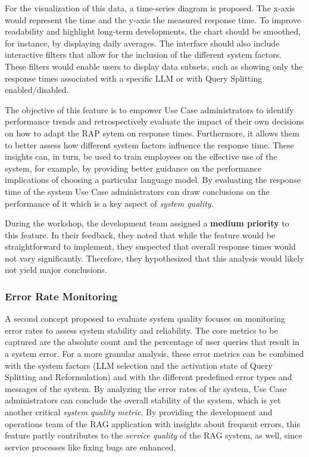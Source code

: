 \documentclass[
	english,
	ruledheaders=section,%
	class=report,%
	thesis={type=bachelor},%
	accentcolor=1b,%
	custommargins=true,%
	marginpar=false,%
	parskip=half-,%
	fontsize=11pt,%
	DIV=14,
]{tudapub}
\begin{document}
For the visualization of this data, a time-series diagram is proposed. The x-axis would represent the time and the y-axis the measured response time. To improve readability and highlight long-term developments, the chart should be smoothed, for instance, by displaying daily averages. The interface should also include interactive filters that allow for the inclusion of the different system factors. These filters would enable users to display data subsets, such as showing only the response times associated with a specific LLM or with Query Splitting enabled/disabled.

The objective of this feature is to empower Use Case administrators to identify performance trends and retrospectively evaluate the impact of their own decisions on how to adapt the RAP sytem on response times. Furthermore, it allows them to better assess how different system factors influence the response time. These insights can, in turn, be used to train employees on the effective use of the system, for example, by providing better guidance on the performance implications of choosing a particular language model. By evaluating the response time of the system Use Case administrators can draw conclusions on the performance of it which is a key aspect of \textit{system quality}.

During the workshop, the development team assigned a \textbf{medium priority} to this feature. In their feedback, they noted that while the feature would be straightforward to implement, they suspected that overall response times would not vary significantly. Therefore, they hypothesized that this analysis would likely not yield major conclusions.

\subsubsection{Error Rate Monitoring}
A second concept proposed to evaluate system quality focuses on monitoring error rates to assess system stability and reliability. The core metrics to be captured are the absolute count and the percentage of user queries that result in a system error. For a more granular analysis, these error metrics can be combined with the system factors (LLM selection and the activation state of Query Splitting and Reformulation) and with the different predefined error types and messages of the system. By analyzing the error rates of the system, Use Case administrators can conclude the overall stability of the system, which is yet another critical \textit{system quality metric}. By providing the development and operations team of the RAG application with insights about frequent errors, this feature partly contributes to the \textit{service quality} of the RAG system, as well, since service processes like fixing bugs are enhanced.
\end{document}
